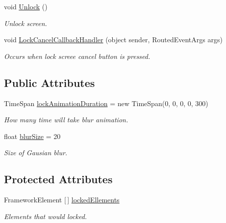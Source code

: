 \begin{DoxyCompactItemize}
void \mbox{\hyperlink{class_wpf_handler_1_1_u_i_1_1_controls_1_1_lock_screen_a2411f98b2544601d6310967dc93064a2}{Unlock}} ()
\begin{DoxyCompactList}\small\item\em Unlock screen. \end{DoxyCompactList}\item 
void \mbox{\hyperlink{class_wpf_handler_1_1_u_i_1_1_controls_1_1_lock_screen_ab3d0b280c769a2c9ed57766d03791fd7}{Lock\+Cancel\+Callback\+Handler}} (object sender, Routed\+Event\+Args args)
\begin{DoxyCompactList}\small\item\em Occurs when lock screee cancel button is pressed. \end{DoxyCompactList}\end{DoxyCompactItemize}
\subsection*{Public Attributes}
\begin{DoxyCompactItemize}
\item 
Time\+Span \mbox{\hyperlink{class_wpf_handler_1_1_u_i_1_1_controls_1_1_lock_screen_aa2733098fb7a92be1c98a6b0ac47972c}{lock\+Animation\+Duration}} = new Time\+Span(0, 0, 0, 0, 300)
\begin{DoxyCompactList}\small\item\em How many time will take blur animation. \end{DoxyCompactList}\item 
float \mbox{\hyperlink{class_wpf_handler_1_1_u_i_1_1_controls_1_1_lock_screen_a5152e45504e88316e8d76753577ea4b5}{blur\+Size}} = 20
\begin{DoxyCompactList}\small\item\em Size of Gausian blur. \end{DoxyCompactList}\end{DoxyCompactItemize}
\subsection*{Protected Attributes}
\begin{DoxyCompactItemize}
\item 
Framework\+Element \mbox{[}$\,$\mbox{]} \mbox{\hyperlink{class_wpf_handler_1_1_u_i_1_1_controls_1_1_lock_screen_a6c0e4649ba3a27b7e55d32ddf093d4dd}{locked\+Ellements}}
\begin{DoxyCompactList}\small\item\em Elements that would locked. \end{DoxyCompactList}\end{DoxyCompactItemize}

